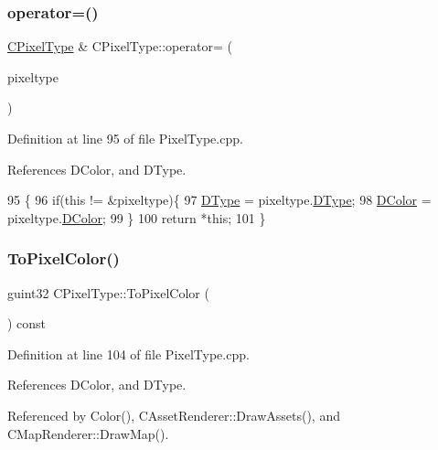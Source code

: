 \subsubsection{\texorpdfstring{operator=()}{operator=()}}
{\footnotesize\ttfamily \hyperlink{classCPixelType}{C\+Pixel\+Type} \& C\+Pixel\+Type\+::operator= (\begin{DoxyParamCaption}\item[{const \hyperlink{classCPixelType}{C\+Pixel\+Type} \&}]{pixeltype }\end{DoxyParamCaption})}



Definition at line 95 of file Pixel\+Type.\+cpp.



References D\+Color, and D\+Type.


\begin{DoxyCode}
95                                                             \{
96     \textcolor{keywordflow}{if}(\textcolor{keyword}{this} != &pixeltype)\{
97         \hyperlink{classCPixelType_aca37f042b510a349e0d3209c73ae51c5}{DType} = pixeltype.\hyperlink{classCPixelType_aca37f042b510a349e0d3209c73ae51c5}{DType};
98         \hyperlink{classCPixelType_a474243cf748aee94cfa207659e940b6c}{DColor} = pixeltype.\hyperlink{classCPixelType_a474243cf748aee94cfa207659e940b6c}{DColor};   
99     \}
100     \textcolor{keywordflow}{return} *\textcolor{keyword}{this};
101 \}
\end{DoxyCode}
\hypertarget{classCPixelType_abdad3e51c47f410745f7795931798cb3}{}\label{classCPixelType_abdad3e51c47f410745f7795931798cb3} 
\subsubsection{\texorpdfstring{To\+Pixel\+Color()}{ToPixelColor()}}
{\footnotesize\ttfamily guint32 C\+Pixel\+Type\+::\+To\+Pixel\+Color (\begin{DoxyParamCaption}{ }\end{DoxyParamCaption}) const}



Definition at line 104 of file Pixel\+Type.\+cpp.



References D\+Color, and D\+Type.



Referenced by Color(), C\+Asset\+Renderer\+::\+Draw\+Assets(), and C\+Map\+Renderer\+::\+Draw\+Map().


